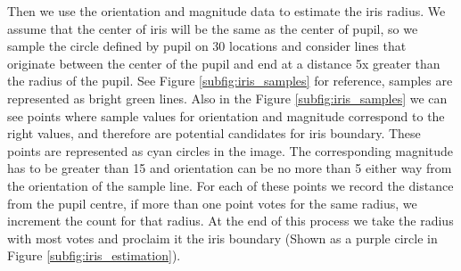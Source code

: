 Then we use the orientation and magnitude data to estimate the iris radius. We assume that the center of iris will be the same as the center of pupil, so we sample the circle defined by pupil on 30 locations and consider lines that originate between the center of the pupil and end at a distance 5x greater than the radius of the pupil. See Figure \ref{subfig:iris_samples} for reference, samples are represented as bright green lines. 
Also in the Figure \ref{subfig:iris_samples} we can see points where sample values for orientation and magnitude correspond to the right values, and therefore are potential candidates for iris boundary. These points are represented as cyan circles in the image. The corresponding magnitude has to be greater than 15 and orientation can be no more than  5 either way from the orientation of the sample line. For each of these points we record the distance from the pupil centre, if more than one point votes for the same radius, we increment the count for that radius. At the end of this process we take the radius with most votes and proclaim it the iris boundary (Shown as a purple circle in Figure \ref{subfig:iris_estimation}).

